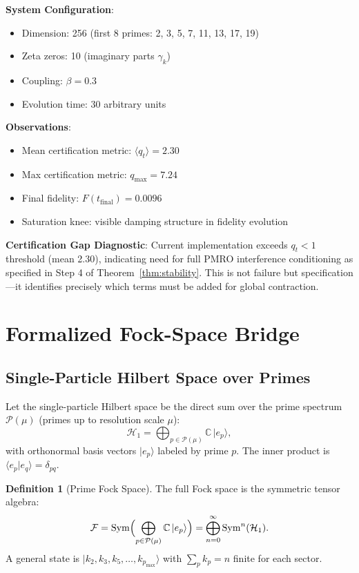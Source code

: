 \documentclass[11pt,a4paper]{article}
\theoremstyle{plain}
\theoremstyle{definition}
\newtheorem{definition}[theorem]{Definition}
\theoremstyle{remark}
\begin{document}
\textbf{System Configuration}:
\begin{itemize}[leftmargin=*]
\item Dimension: 256 (first 8 primes: 2, 3, 5, 7, 11, 13, 17, 19)
\item Zeta zeros: 10 (imaginary parts \(\gamma_k\))
\item Coupling: \(\beta = 0.3\)
\item Evolution time: 30 arbitrary units
\end{itemize}

\textbf{Observations}:
\begin{itemize}[leftmargin=*]
\item Mean certification metric: \(\langle q_t \rangle = 2.30\)
\item Max certification metric: \(q_{\max} = 7.24\)
\item Final fidelity: \(F(t_{\text{final}}) = 0.0096\)
\item Saturation knee: visible damping structure in fidelity evolution
\end{itemize}

\textbf{Certification Gap Diagnostic}: Current implementation exceeds \(q_t < 1\) threshold (mean 2.30), indicating need for full PMRO interference conditioning as specified in Step 4 of Theorem~\ref{thm:stability}. This is not failure but specification---it identifies precisely which terms must be added for global contraction.

\section{Formalized Fock-Space Bridge}\label{sec:fock}

\subsection{Single-Particle Hilbert Space over Primes}

Let the single-particle Hilbert space be the direct sum over the prime spectrum \(\mathcal{P}(\mu)\) (primes up to resolution scale \(\mu\)):
\[
\mathcal{H}_1 = \bigoplus_{p \in \mathcal{P}(\mu)} \mathbb{C} \, |e_p\rangle,
\]
with orthonormal basis vectors \(|e_p\rangle\) labeled by prime \(p\). The inner product is \(\langle e_p | e_q \rangle = \delta_{pq}\).

\begin{definition}[Prime Fock Space]
The full Fock space is the symmetric tensor algebra:
\[
\mathcal{F} = \operatorname{Sym}\Bigl( \bigoplus_{p \in \mathcal{P}(\mu)} \mathbb{C} \, |e_p\rangle \Bigr) = \bigoplus_{n=0}^\infty \operatorname{Sym}^n(\mathcal{H}_1).
\]
A general state is \(|k_2, k_3, k_5, \ldots, k_{p_{\max}}\rangle\) with \(\sum_p k_p = n\) finite for each sector.
\end{definition}
\end{document}
